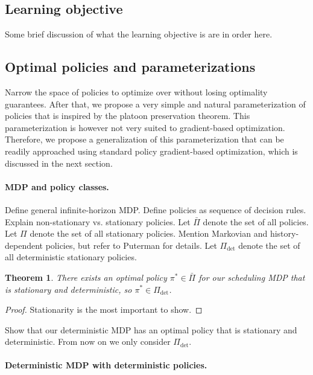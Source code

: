 \documentclass[a4paper]{report}
\theoremstyle{definition}
\theoremstyle{plain}
\newtheorem{theorem}{Theorem}[chapter]
\newcommand\note[1]{{\color{Navy}#1}}
\begin{document}
\subsection{Learning objective}

Some brief discussion of what the learning objective is are in order here.

\clearpage

\subsection{Optimal policies and parameterizations}

Narrow the space of policies to optimize over without losing optimality guarantees.
%
After that, we propose a very simple and natural parameterization of policies
that is inspired by the platoon preservation theorem. This parameterization is
however not very suited to gradient-based optimization. Therefore, we propose a
generalization of this parameterization that can be readily approached using
standard policy gradient-based optimization, which is discussed in the next
section.

\paragraph{MDP and policy classes.}

Define general infinite-horizon MDP.
Define policies as sequence of decision rules.
Explain non-stationary vs. stationary policies.
Let $\bar{\Pi}$ denote the set of all policies.
Let $\Pi$ denote the set of all stationary policies.
Mention Markovian and history-dependent policies, but refer to Puterman for details.
Let $\Pi_\text{det}$ denote the set of all deterministic stationary policies.


\begin{theorem}
  There exists an optimal policy $\pi^* \in \bar{\Pi}$ for our scheduling MDP
  that is stationary and deterministic, so $\pi^* \in \Pi_\text{det}$.
\end{theorem}
\begin{proof}
  Stationarity is the most important to show.
\end{proof}

\note{Show that our deterministic MDP has an optimal policy that is stationary
  and deterministic.} \note{From now on we only consider $\Pi_\text{det}$}.

\paragraph{Deterministic MDP with deterministic policies.}
\end{document}
